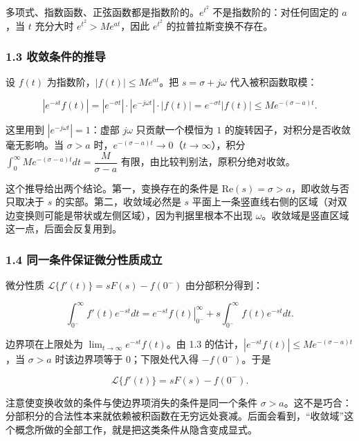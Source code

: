 \documentclass[12pt]{ctexart}
\begin{document}
多项式、指数函数、正弦函数都是指数阶的。\(e^{t^{2}}\)
不是指数阶的：对任何固定的 \(a\)，当 \(t\) 充分大时
\(e^{t^{2}}>Me^{at}\)，因此 \(e^{t^{2}}\) 的拉普拉斯变换不存在。

\hypertarget{ux6536ux655bux6761ux4ef6ux7684ux63a8ux5bfc}{%
\subsubsection{1.3
收敛条件的推导}\label{ux6536ux655bux6761ux4ef6ux7684ux63a8ux5bfc}}

设 \(f(t)\) 为指数阶，\(|f(t)|\le Me^{at}\)。把 \(s=\sigma+j\omega\)
代入被积函数取模：

\[
\left|e^{-st}f(t)\right|=\left|e^{-\sigma t}\right|\cdot\left|e^{-j\omega t}\right|\cdot|f(t)|=e^{-\sigma t}|f(t)|\le Me^{-(\sigma-a)t}.
\]

这里用到 \(\left|e^{-j\omega t}\right|=1\)：虚部 \(j\omega\)
只贡献一个模恒为 \(1\) 的旋转因子，对积分是否收敛毫无影响。当
\(\sigma>a\) 时，\(e^{-(\sigma-a)t}\to 0\)（\(t\to\infty\)），积分
\(\int_{0}^{\infty}Me^{-(\sigma-a)t}dt=\dfrac{M}{\sigma-a}\)
有限，由比较判别法，原积分绝对收敛。

这个推导给出两个结论。第一，变换存在的条件是
\(\mathrm{Re}(s)=\sigma>a\)，即收敛与否只取决于 \(s\)
的实部。第二，收敛域必然是 \(s\)
平面上一条竖直线右侧的区域（对双边变换则可能是带状或左侧区域），因为判据里根本不出现
\(\omega\)。收敛域是竖直区域这一点，后面会反复用到。

\hypertarget{ux540cux4e00ux6761ux4ef6ux4fddux8bc1ux5faeux5206ux6027ux8d28ux6210ux7acb}{%
\subsubsection{1.4
同一条件保证微分性质成立}\label{ux540cux4e00ux6761ux4ef6ux4fddux8bc1ux5faeux5206ux6027ux8d28ux6210ux7acb}}

微分性质 \(\mathcal{L}\{f'(t)\}=sF(s)-f(0^{-})\) 由分部积分得到：

\[
\int_{0^{-}}^{\infty}f'(t)e^{-st}dt=\left.e^{-st}f(t)\right|_{0^{-}}^{\infty}+s\int_{0^{-}}^{\infty}f(t)e^{-st}dt.
\]

边界项在上限处为 \(\lim_{t\to\infty}e^{-st}f(t)\)。由 1.3
的估计，\(\left|e^{-st}f(t)\right|\le Me^{-(\sigma-a)t}\)，当
\(\sigma>a\) 时该边界项等于 \(0\)；下限处代入得 \(-f(0^{-})\)。于是

\[
\mathcal{L}\{f'(t)\}=sF(s)-f(0^{-}).
\]

注意使变换收敛的条件与使边界项消失的条件是同一个条件
\(\sigma>a\)。这不是巧合：分部积分的合法性本来就依赖被积函数在无穷远处衰减。后面会看到，``收敛域''这个概念所做的全部工作，就是把这类条件从隐含变成显式。
\end{document}
